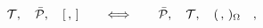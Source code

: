 \begin{equation}\label{5.24}
{\cal T},\quad \bar{\cal P},\quad [\,,\,]\quad\quad\Longleftrightarrow
\quad\quad\bar{\cal P},\quad{\cal T},\quad(\,,\,)_\Omega\quad,
\end{equation}

